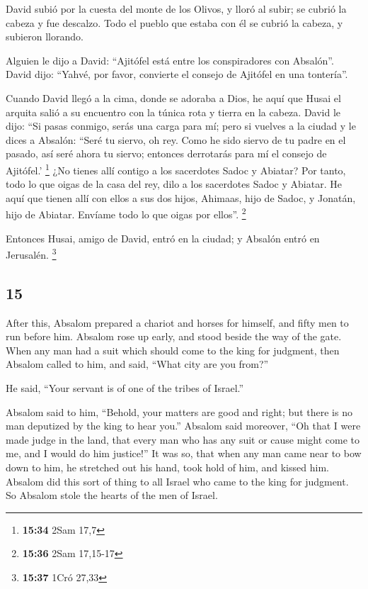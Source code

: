 \begin{paracol}{2}
 David subió por la cuesta del monte de los Olivos, y
lloró al subir; se cubrió la cabeza y fue descalzo. Todo el pueblo que
estaba con él se cubrió la cabeza, y subieron llorando.

 Alguien le dijo a David: ``Ajitófel está entre los
conspiradores con Absalón''. David dijo: ``Yahvé, por favor, convierte
el consejo de Ajitófel en una tontería''.

 Cuando David llegó a la cima, donde se adoraba a Dios,
he aquí que Husai el arquita salió a su encuentro con la túnica rota y
tierra en la cabeza.  David le dijo: ``Si pasas conmigo,
serás una carga para mí;  pero si vuelves a la ciudad y
le dices a Absalón: ``Seré tu siervo, oh rey. Como he sido siervo de tu
padre en el pasado, así seré ahora tu siervo; entonces derrotarás para
mí el consejo de Ajitófel.' \footnote{\textbf{15:34} 2Sam 17,7}
 ¿No tienes allí contigo a los sacerdotes Sadoc y
Abiatar? Por tanto, todo lo que oigas de la casa del rey, dilo a los
sacerdotes Sadoc y Abiatar.  He aquí que tienen allí con
ellos a sus dos hijos, Ahimaas, hijo de Sadoc, y Jonatán, hijo de
Abiatar. Envíame todo lo que oigas por ellos''. \footnote{\textbf{15:36}
  2Sam 17,15-17}

 Entonces Husai, amigo de David, entró en la ciudad; y
Absalón entró en Jerusalén. \footnote{\textbf{15:37} 1Cró 27,33}

\switchcolumn
\begin{otherlanguage}{english}

\hypertarget{section-29}{%
\section{15}\label{section-29}}

 After this, Absalom prepared a chariot and horses for
himself, and fifty men to run before him.  Absalom rose up
early, and stood beside the way of the gate. When any man had a suit
which should come to the king for judgment, then Absalom called to him,
and said, ``What city are you from?''

He said, ``Your servant is of one of the tribes of Israel.''

 Absalom said to him, ``Behold, your matters are good and
right; but there is no man deputized by the king to hear you.''
 Absalom said moreover, ``Oh that I were made judge in the
land, that every man who has any suit or cause might come to me, and I
would do him justice!''  It was so, that when any man came
near to bow down to him, he stretched out his hand, took hold of him,
and kissed him.  Absalom did this sort of thing to all
Israel who came to the king for judgment. So Absalom stole the hearts of
the men of Israel.


\end{otherlanguage}
\end{paracol}

